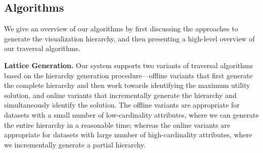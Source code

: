 \subsection{Algorithms\label{algorithms}}
We give an overview of our algorithms by first discussing the approaches to generate the visualization hierarchy, and then presenting a high-level overview of our traversal algorithms.

\textbf{Lattice Generation.} Our system supports two variants of traversal algorithms based on the hierarchy generation procedure---offline variants that first generate the complete hierarchy and then work towards identifying the maximum utility solution, and online variants that incrementally generate the hierarchy and simultaneously identify the solution. The offline variants are appropriate for datasets with a small number of low-cardinality attributes, where we can generate the entire hierarchy in a reasonable time; whereas the online variants are appropriate for datasets with large number of high-cardinality attributes, where we incrementally generate a partial hierarchy. 


